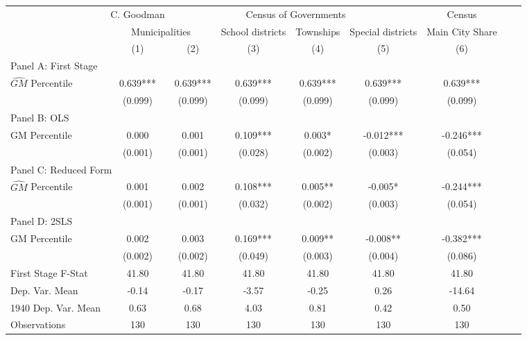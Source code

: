  \begin{tabular}{l*{8}{c}} \toprule
&\multicolumn{1}{c}{C. Goodman}&\multicolumn{4}{c}{Census of Governments}&\multicolumn{1}{c}{Census}\\\cmidrule(lr){2-2}\cmidrule(lr){3-6}\cmidrule(lr){7-7}
&\multicolumn{2}{c}{Municipalities}&\multicolumn{1}{c}{School districts}&\multicolumn{1}{c}{Townships}&\multicolumn{1}{c}{Special districts}&\multicolumn{1}{c}{Main City Share}\\\cmidrule(lr){2-3}\cmidrule(lr){4-6}\cmidrule(lr){7-7}
&\multicolumn{1}{c}{(1)}&\multicolumn{1}{c}{(2)}&\multicolumn{1}{c}{(3)}&\multicolumn{1}{c}{(4)}&\multicolumn{1}{c}{(5)}&\multicolumn{1}{c}{(6)}\\
\cmidrule(lr){1-7}
\multicolumn{6}{l}{Panel A: First Stage}\\
\cmidrule(lr){1-7}
$\widehat{GM}$ Percentile&    0.639***&    0.639***&    0.639***&    0.639***&    0.639***&    0.639***\\
                &  (0.099)   &  (0.099)   &  (0.099)   &  (0.099)   &  (0.099)   &  (0.099)   \\
\cmidrule(lr){1-7}
\multicolumn{6}{l}{Panel B: OLS}\\
\cmidrule(lr){1-7}
GM Percentile   &    0.000   &    0.001   &    0.109***&    0.003*  &   -0.012***&   -0.246***\\
                &  (0.001)   &  (0.001)   &  (0.028)   &  (0.002)   &  (0.003)   &  (0.054)   \\
\cmidrule(lr){1-7}
\multicolumn{6}{l}{Panel C: Reduced Form}\\
\cmidrule(lr){1-7}
$\widehat{GM}$ Percentile&    0.001   &    0.002   &    0.108***&    0.005** &   -0.005*  &   -0.244***\\
                &  (0.001)   &  (0.001)   &  (0.032)   &  (0.002)   &  (0.003)   &  (0.054)   \\
\cmidrule(lr){1-7}
\multicolumn{6}{l}{Panel D: 2SLS}\\
\cmidrule(lr){1-7}
GM Percentile   &    0.002   &    0.003   &    0.169***&    0.009** &   -0.008** &   -0.382***\\
                &  (0.002)   &  (0.002)   &  (0.049)   &  (0.003)   &  (0.004)   &  (0.086)   \\
\midrule
First Stage F-Stat&    41.80   &    41.80   &    41.80   &    41.80   &    41.80   &    41.80   \\
Dep. Var. Mean  &    -0.14   &    -0.17   &    -3.57   &    -0.25   &     0.26   &   -14.64   \\
1940 Dep. Var. Mean&     0.63   &     0.68   &     4.03   &     0.81   &     0.42   &     0.50   \\
Observations    &      130   &      130   &      130   &      130   &      130   &      130   \\
       \bottomrule \end{tabular}
